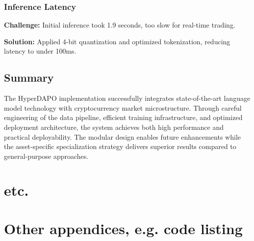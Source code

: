 \documentclass{report}
\begin{document}
\subsection{Inference Latency}

\textbf{Challenge:} Initial inference took 1.9 seconds, too slow for real-time trading.

\textbf{Solution:} Applied 4-bit quantization and optimized tokenization, reducing latency to under 100ms.

\section{Summary}

The HyperDAPO implementation successfully integrates state-of-the-art language model technology with cryptocurrency market microstructure. Through careful engineering of the data pipeline, efficient training infrastructure, and optimized deployment architecture, the system achieves both high performance and practical deployability. The modular design enables future enhancements while the asset-specific specialization strategy delivers superior results compared to general-purpose approaches.

\chapter{etc.}
\appendix




\chapter{Other appendices, e.g. code listing}
\end{document}
